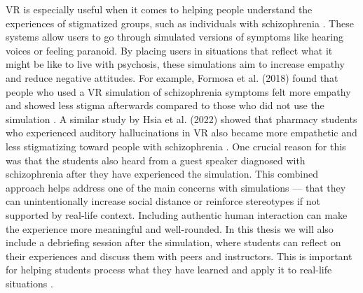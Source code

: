 VR is especially useful when it comes to helping people understand the experiences of stigmatized groups, such as individuals with schizophrenia \cite{Formosa2018, Marques2022, Mattsson2024}. These systems allow users to go through simulated versions of symptoms like hearing voices or feeling paranoid. By placing users in situations that reflect what it might be like to live with psychosis, these simulations aim to increase empathy and reduce negative attitudes. For example, Formosa et al. (2018) found that people who used a VR simulation of schizophrenia symptoms felt more empathy and showed less stigma afterwards compared to those who did not use the simulation \cite{Formosa2018}. A similar study by Hsia et al. (2022) showed that pharmacy students who experienced auditory hallucinations in VR also became more empathetic and less stigmatizing toward people with schizophrenia \cite{Hsia2022}. One crucial reason for this was that the students also heard from a guest speaker diagnosed with schizophrenia after they have experienced the simulation. This combined approach helps address one of the main concerns with simulations — that they can unintentionally increase social distance or reinforce stereotypes if not supported by real-life context. Including authentic human interaction can make the experience more meaningful and well-rounded. In this thesis we will also include a debriefing session after the simulation, where students can reflect on their experiences and discuss them with peers and instructors. This is important for helping students process what they have learned and apply it to real-life situations \cite{Hsia2022}.

